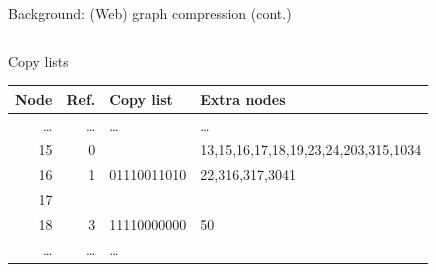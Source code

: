 \documentclass[aspectratio=169,xcolor=table]{beamer}
\begin{document}
\begin{frame}{Background: (Web) graph compression (cont.)}
\begin{columns}
\begin{column}{0.60\columnwidth}
\begin{block}{Copy lists}
\begin{center}
                        \begin{tabular}{rrll}
                            \alert{Node} & \alert{Ref.} & \alert{Copy list} & \alert{Extra nodes}\\
                            \hline
                            \ldots{} & \ldots{} & \ldots{} & \ldots{}\\
                            15 & 0 &  & 13,15,16,17,18,19,23,24,203,315,1034\\
                            16 & 1 & 01110011010 & 22,316,317,3041\\
                            17 &  &  & \\
                            18 & 3 & 11110000000 & 50\\
                            \ldots{} & \ldots{} & \ldots{} & \\
                        \end{tabular}
                    \end{center}
                \end{block}
            \end{column}
        \end{columns}
    \end{frame}
\end{document}
